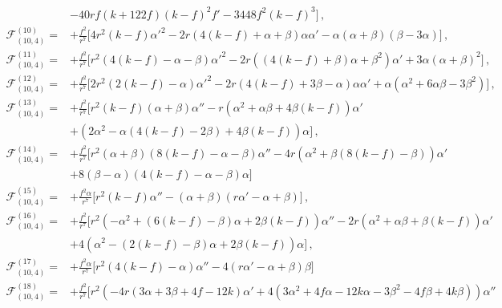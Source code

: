 \documentclass[11pt]{article}
\begin{document}
{\begin{align}
\nonumber
\\
&- 40 r f (k + 122 f) \left(k-f \right)^2 f' - 3448 f^2 (k-f)^3 \bigg] \, ,
\\
\mathcal{F}_{(10, 4)}^{(10)} =&+ \frac{f^2}{r^7} \bigg[4 r^2 (k-f) \alpha'^2 - 2 r \left( 4(k-f) + \alpha + \beta \right) \alpha \alpha'  - \alpha (\alpha + \beta)(\beta - 3 \alpha) \bigg] \, , 
\\
\mathcal{F}_{(10, 4)}^{(11)} =&+ \frac{f^2}{r^7} \bigg[ r^2 \left(4(k-f) - \alpha -\beta \right) \alpha'^2 - 2 r \left(\left(4(k-f) + \beta \right) \alpha + \beta^2 \right) \alpha'  + 3 \alpha (\alpha + \beta)^2 \bigg] \, , 
\\
\mathcal{F}_{(10, 4)}^{(12)} =&+\frac{f^2}{r^7} \bigg[2r^2 \left(2(k-f) - \alpha \right) \alpha'^2 - 2 r \left(4(k-f) + 3 \beta - \alpha \right) \alpha \alpha' + \alpha \left(\alpha^2  + 6 \alpha \beta  -3 \beta^2 \right) \bigg] \, , 
\\
\mathcal{F}_{(10, 4)}^{(13)} =&+ \frac{f^2}{r^7} \bigg[ r^2 (k-f) (\alpha +\beta) \alpha'' - r \left(\alpha^2 + \alpha \beta + 4 \beta(k-f) \right) \alpha'  
\nonumber
\\
&+ \left(2 \alpha^2  - \alpha \left(4(k-f) - 2 \beta \right) + 4 \beta(k-f) \right) \alpha  \bigg] \, ,
\\ 
\mathcal{F}_{(10, 4)}^{(14)} =&+ \frac{f^2}{r^7} \bigg[ r^2 (\alpha + \beta) \left(8(k-f) - \alpha - \beta \right) \alpha'' - 4 r \left(\alpha^2 + \beta \left( 8 (k-f) - \beta \right) \right) \alpha' 
\nonumber
\\
&+ 8 (\beta-\alpha) \left(4(k-f) - \alpha -\beta \right) \alpha \bigg]
\\ 
\mathcal{F}_{(10, 4)}^{(15)} =&+ \frac{f^2 \alpha }{r^7} \bigg[ r^2(k-f) \alpha'' - (\alpha + \beta) \left(r \alpha' - \alpha + \beta \right) \bigg] \, ,
\\ 
\mathcal{F}_{(10, 4)}^{(16)} =&+ \frac{f^2  }{r^7} \bigg[r^2 \left(-\alpha^2 + \left(6(k-f) - \beta \right) \alpha + 2 \beta (k-f) \right) \alpha'' - 2 r \left(\alpha^2 + \alpha \beta + \beta(k-f)  \right) \alpha' 
\nonumber\\
&+ 4 \left(\alpha^2 - \left(2(k-f) - \beta \right) \alpha + 2 \beta (k - f) \right) \alpha \bigg] \, ,
\\
\mathcal{F}_{(10, 4)}^{(17)} =&+  \frac{f^2 \alpha }{r^7} \bigg[ r^2 \left( 4(k-f) - \alpha \right) \alpha'' - 4 \left(r \alpha' - \alpha + \beta \right) \beta \bigg]
\\ 
\mathcal{F}_{(10, 4)}^{(18)} =&+ \frac{f^2  }{r^7} \bigg[  r^2 \left( -4 r \left(3 \alpha + 3 \beta + 4 f - 12 k \right) \alpha' + 4 \left(3 \alpha^2 + 4 f \alpha - 12 k \alpha - 3 \beta^2 - 4 f \beta + 4 k \beta \right)  \right) \alpha'' 

\end{align}}
\end{document}
